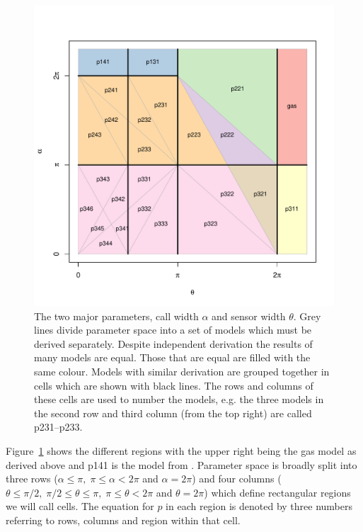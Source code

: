 \documentclass[a4paper,10pt,reqno,oneside]{amsart}
\begin{document}
\begin{figure}
\centering
\includegraphics[width=1\textwidth]{imgs/equalRegions.pdf}
\caption{The two major parameters, call width $\alpha$ and sensor width $\theta$. Grey lines divide parameter space into a set of models which must be derived separately. Despite independent derivation the results of many models are equal. Those that are equal are filled with the same colour. Models with similar derivation are grouped together in cells which are shown with black lines. The rows and columns of these cells are used to number the models, e.g. the three models in the second row and  third column (from the top right) are called p231--p233.}
\label{f:regions}
\end{figure}



Figure~\ref{f:regions} shows the different regions with the upper right being the gas model as derived above and p141 is the model from \cite{rowcliffe2008estimating}. Parameter space is broadly split into three rows ($ \alpha \le \pi,\; \pi \le \alpha < 2\pi$ and $ \alpha = 2\pi$) and four columns ($ \theta \le \pi/2,\;  \pi/2 \le \theta \le  \pi,\;  \pi \le \theta < 2\pi$ and $\theta = 2\pi$) which define rectangular regions we will call cells. The equation for $p$ in each region is denoted by three numbers referring to rows, columns and region within that cell. 
\end{document}
